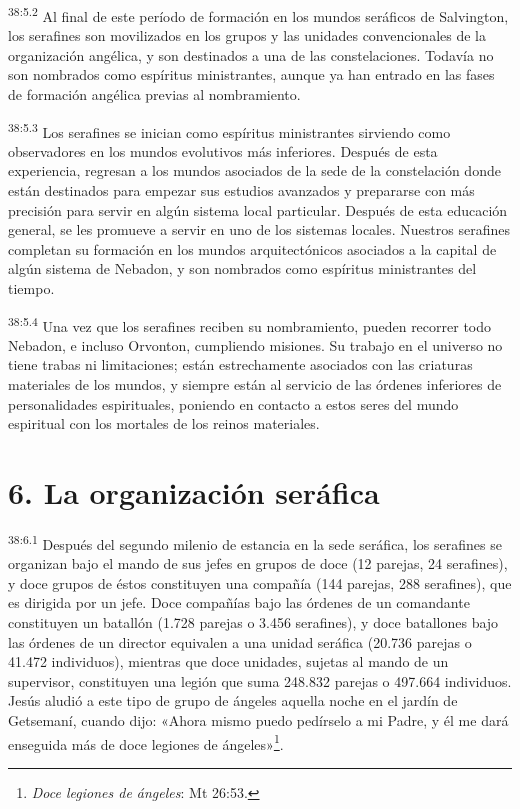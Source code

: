 \par
\textsuperscript{38:5.2} Al final de este período de formación en los mundos seráficos de Salvington, los serafines son movilizados en los grupos y las unidades convencionales de la organización angélica, y son destinados a una de las constelaciones. Todavía no son nombrados como espíritus ministrantes, aunque ya han entrado en las fases de formación angélica previas al nombramiento.

\par
\textsuperscript{38:5.3} Los serafines se inician como espíritus ministrantes sirviendo como observadores en los mundos evolutivos más inferiores. Después de esta experiencia, regresan a los mundos asociados de la sede de la constelación donde están destinados para empezar sus estudios avanzados y prepararse con más precisión para servir en algún sistema local particular. Después de esta educación general, se les promueve a servir en uno de los sistemas locales. Nuestros serafines completan su formación en los mundos arquitectónicos asociados a la capital de algún sistema de Nebadon, y son nombrados como espíritus ministrantes del tiempo.

\par
\textsuperscript{38:5.4} Una vez que los serafines reciben su nombramiento, pueden recorrer todo Nebadon, e incluso Orvonton, cumpliendo misiones. Su trabajo en el universo no tiene trabas ni limitaciones; están estrechamente asociados con las criaturas materiales de los mundos, y siempre están al servicio de las órdenes inferiores de personalidades espirituales, poniendo en contacto a estos seres del mundo espiritual con los mortales de los reinos materiales.

\section*{6. La organización seráfica}
\par
\textsuperscript{38:6.1} Después del segundo milenio de estancia en la sede seráfica, los serafines se organizan bajo el mando de sus jefes en grupos de doce (12 parejas, 24 serafines), y doce grupos de éstos constituyen una compañía (144 parejas, 288 serafines), que es dirigida por un jefe. Doce compañías bajo las órdenes de un comandante constituyen un batallón (1.728 parejas o 3.456 serafines), y doce batallones bajo las órdenes de un director equivalen a una unidad seráfica (20.736 parejas o 41.472 individuos), mientras que doce unidades, sujetas al mando de un supervisor, constituyen una legión que suma 248.832 parejas o 497.664 individuos. Jesús aludió a este tipo de grupo de ángeles aquella noche en el jardín de Getsemaní, cuando dijo: «Ahora mismo puedo pedírselo a mi Padre, y él me dará enseguida más de doce legiones de ángeles»\footnote{\textit{Doce legiones de ángeles}: Mt 26:53.}.

